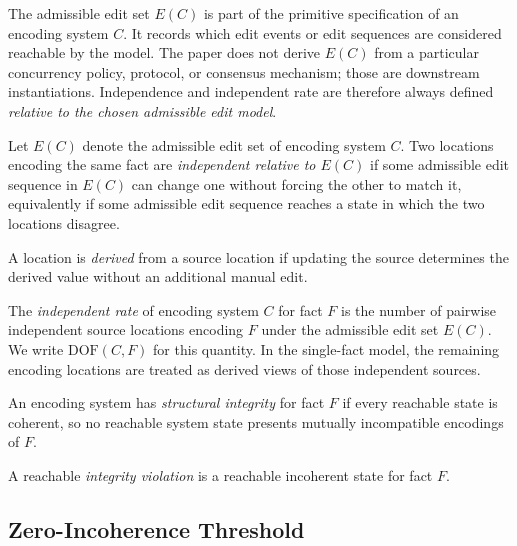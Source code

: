 The admissible edit set $E(C)$ is part of the primitive specification of an encoding system $C$. It records which edit events or edit sequences are considered reachable by the model. The paper does not derive $E(C)$ from a particular concurrency policy, protocol, or consensus mechanism; those are downstream instantiations. Independence and independent rate are therefore always defined \emph{relative to the chosen admissible edit model}.

\begin{definition}\label{def:independent}
Let $E(C)$ denote the admissible edit set of encoding system $C$. Two locations encoding the same fact are \emph{independent relative to $E(C)$} if some admissible edit sequence in $E(C)$ can change one without forcing the other to match it, equivalently if some admissible edit sequence reaches a state in which the two locations disagree.
\end{definition}

\begin{definition}\label{def:derived}
A location is \emph{derived} from a source location if updating the source determines the derived value without an additional manual edit.
\end{definition}

\begin{definition}\label{def:dof}
The \emph{independent rate} of encoding system $C$ for fact $F$ is the number of pairwise independent source locations encoding $F$ under the admissible edit set $E(C)$. We write $\mathrm{DOF}(C,F)$ for this quantity. In the single-fact model, the remaining encoding locations are treated as derived views of those independent sources.
\end{definition}

\begin{definition}\label{def:structural-integrity}
An encoding system has \emph{structural integrity} for fact $F$ if every reachable state is coherent, so no reachable system state presents mutually incompatible encodings of $F$.
\end{definition}

\begin{definition}\label{def:integrity-violation}
A reachable \emph{integrity violation} is a reachable incoherent state for fact $F$.
\end{definition}

\subsection{Zero-Incoherence Threshold}\label{sec:capacity}

